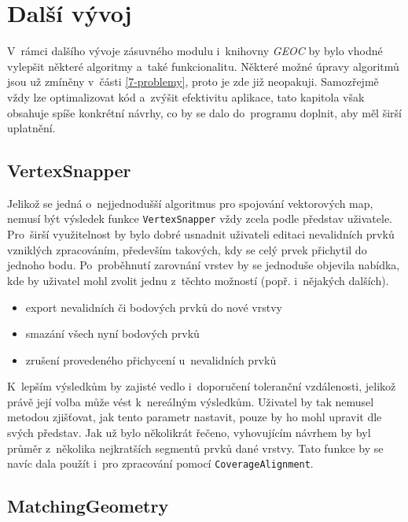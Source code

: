 \chapter{Další vývoj}
\label{9-vyvoj}

V~rámci dalšího vývoje zásuvného modulu i~knihovny \textit{GEOC}
by bylo vhodné vylepšit některé algoritmy a~také funkcionalitu.
Některé možné úpravy algoritmů jsou už zmíněny v~části 
\ref{7-problemy}, proto je zde již neopakuji. 
Samozřejmě vždy lze optimalizovat kód a~zvýšit efektivitu aplikace,
tato kapitola však obsahuje spíše konkrétní návrhy, co by se dalo 
do~programu doplnit, aby měl širší uplatnění.


\section{VertexSnapper}
\label{vs-vyvoj}
%
Jelikož se jedná o~nejjednodušší algoritmus pro spojování vektorových map,
nemusí být výsledek funkce \texttt{Vertex\-Snapper} vždy zcela podle
představ uživatele. Pro~širší využitelnost by bylo dobré usnadnit
uživateli editaci nevalidních prvků vzniklých zpracováním, především
takových, kdy se celý prvek přichytil do jednoho bodu. Po~proběhnutí
zarovnání vrstev by se jednoduše objevila nabídka, kde by uživatel mohl
zvolit jednu z~těchto možností (popř. i~nějakých dalších). 

\begin{itemize}
 \itemsep5pt  \parskip0pt  %
 \item export nevalidních či bodových prvků do nové vrstvy 
 \item smazání všech nyní bodových prvků
 \item zrušení provedeného přichycení u~nevalidních prvků
\end{itemize}

K~lepším výsledkům by zajisté vedlo i~doporučení toleranční vzdálenosti,
jelikož právě její volba může vést k~nereálným výsledkům. Uživatel by
tak nemusel metodou  zjišťovat, jak tento parametr 
nastavit, pouze by ho mohl upravit dle svých představ. Jak už bylo
několikrát řečeno, vyhovujícím návrhem by byl průměr z~několika
nejkratších segmentů prvků dané vrstvy. Tato funkce by se navíc dala
použít i~pro zpracování pomocí \texttt{Coverage\-Alignment}.


\section{MatchingGeometry}
\label{mg-vyvoj}

